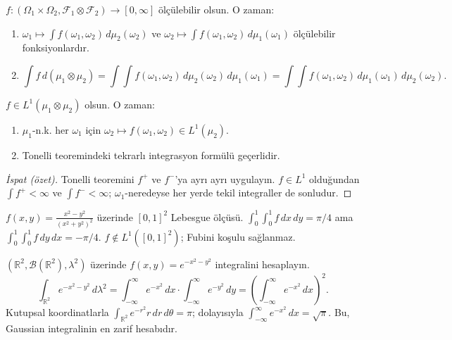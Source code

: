 \begin{teorem}\label{thm:tonelli}
$f: (\Omega_1 \times \Omega_2, \mathcal{F}_1 \otimes \mathcal{F}_2) \to [0,\infty]$
ölçülebilir olsun. O zaman:
\begin{enumerate}[label=(\roman*)]
  \item $\omega_1 \mapsto \int f(\omega_1, \omega_2) \, d\mu_2(\omega_2)$ ve
        $\omega_2 \mapsto \int f(\omega_1, \omega_2) \, d\mu_1(\omega_1)$
        ölçülebilir fonksiyonlardır.
  \item
        \[
          \int f \, d(\mu_1 \otimes \mu_2)
          = \int\!\!\int f(\omega_1,\omega_2) \, d\mu_2(\omega_2) \, d\mu_1(\omega_1)
          = \int\!\!\int f(\omega_1,\omega_2) \, d\mu_1(\omega_1) \, d\mu_2(\omega_2).
        \]
\end{enumerate}
\end{teorem}

\begin{teorem}\label{thm:fubini}
$f \in L^1(\mu_1 \otimes \mu_2)$ olsun. O zaman:
\begin{enumerate}[label=(\roman*)]
  \item $\mu_1$-n.k. her $\omega_1$ için $\omega_2 \mapsto f(\omega_1, \omega_2) \in L^1(\mu_2)$.
  \item Tonelli teoremindeki tekrarlı integrasyon formülü geçerlidir.
\end{enumerate}
\end{teorem}

\begin{proof}[İspat (özet)]
Tonelli teoremini $f^+$ ve $f^-$'ya ayrı ayrı uygulayın.
$f \in L^1$ olduğundan $\int f^+ < \infty$ ve $\int f^- < \infty$;
$\omega_1$-neredeyse her yerde tekil integraller de sonludur.
\end{proof}

\begin{hataanalizi}
$f(x,y) = \frac{x^2 - y^2}{(x^2+y^2)^2}$ üzerinde $[0,1]^2$ Lebesgue ölçüsü.
$\int_0^1 \int_0^1 f \, dx \, dy = \pi/4$ ama $\int_0^1 \int_0^1 f \, dy \, dx = -\pi/4$.
$f \notin L^1([0,1]^2)$; Fubini koşulu sağlanmaz.
\end{hataanalizi}

\begin{ornek}
$(\mathbb{R}^2, \mathcal{B}(\mathbb{R}^2), \lambda^2)$ üzerinde
$f(x,y) = e^{-x^2 - y^2}$ integralini hesaplayın.
\[
  \int_{\mathbb{R}^2} e^{-x^2-y^2} \, d\lambda^2
  = \int_{-\infty}^\infty e^{-x^2} \, dx \cdot \int_{-\infty}^\infty e^{-y^2} \, dy
  = \left(\int_{-\infty}^\infty e^{-x^2} \, dx\right)^{\!2}.
\]
Kutupsal koordinatlarla $\int_{\mathbb{R}^2} e^{-r^2} r \, dr \, d\theta = \pi$;
dolayısıyla $\int_{-\infty}^\infty e^{-x^2} \, dx = \sqrt{\pi}$.
Bu, Gaussian integralinin en zarif hesabıdır.
\end{ornek}

